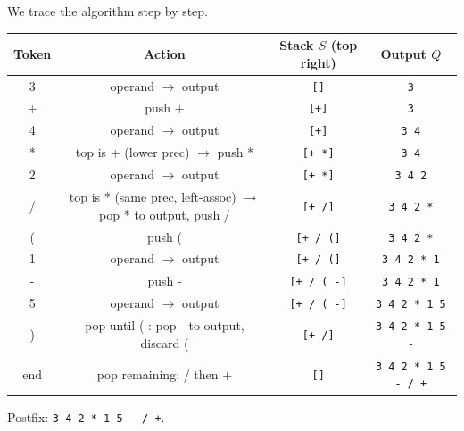 \documentclass[11pt]{article}
\begin{document}
\begin{exemplebox}
We trace the algorithm step by step.

\begin{center}
\begin{tabular}{|c|c|c|c|}\hline
\textbf{Token} & \textbf{Action} & \textbf{Stack $S$ (top right)} & \textbf{Output $Q$} \\ \hline
3 & operand $\to$ output & \texttt{[]} & \texttt{3} \\
+ & push + & \texttt{[+]} & \texttt{3} \\
4 & operand $\to$ output & \texttt{[+]} & \texttt{3 4} \\
* & top is + (lower prec) $\to$ push * & \texttt{[+ *]} & \texttt{3 4} \\
2 & operand $\to$ output & \texttt{[+ *]} & \texttt{3 4 2} \\
/ & top is * (same prec, left-assoc) $\to$ pop * to output, push / & \texttt{[+ /]} & \texttt{3 4 2 *} \\
( & push ( & \texttt{[+ / (]} & \texttt{3 4 2 *} \\
1 & operand $\to$ output & \texttt{[+ / (]} & \texttt{3 4 2 * 1} \\
- & push - & \texttt{[+ / ( -]} & \texttt{3 4 2 * 1} \\
5 & operand $\to$ output & \texttt{[+ / ( -]} & \texttt{3 4 2 * 1 5} \\
) & pop until ( : pop - to output, discard ( & \texttt{[+ /]} & \texttt{3 4 2 * 1 5 -} \\
end & pop remaining: / then + & \texttt{[]} & \texttt{3 4 2 * 1 5 - / +} \\ \hline
\end{tabular}
\end{center}
Postfix: \texttt{3 4 2 * 1 5 - / +}.
\end{exemplebox}
\end{document}
